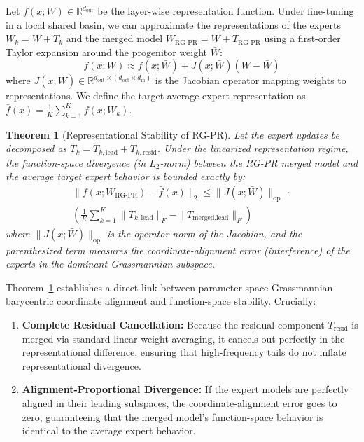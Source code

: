 \documentclass{article}
\theoremstyle{plain}
\newtheorem{theorem}{Theorem}[section]
\theoremstyle{definition}
\theoremstyle{remark}
\begin{document}
Let $f(x; W) \in \mathbb{R}^{d_{\text{out}}}$ be the layer-wise representation function. Under fine-tuning in a local shared basin, we can approximate the representations of the experts $W_k = \bar{W} + T_k$ and the merged model $W_{\text{RG-PR}} = \bar{W} + T_{\text{RG-PR}}$ using a first-order Taylor expansion around the progenitor weight $\bar{W}$:
\begin{equation}
    f(x; W) \approx f(x; \bar{W}) + J(x; \bar{W}) (W - \bar{W})
\end{equation}
where $J(x; \bar{W}) \in \mathbb{R}^{d_{\text{out}} \times (d_{\text{out}} \times d_{\text{in}})}$ is the Jacobian operator mapping weights to representations. We define the target average expert representation as $\bar{f}(x) = \frac{1}{K} \sum_{k=1}^K f(x; W_k)$.

\begin{theorem}[Representational Stability of RG-PR]
\label{thm:stability}
Let the expert updates be decomposed as $T_k = T_{k, \text{lead}} + T_{k, \text{resid}}$. Under the linearized representation regime, the function-space divergence (in $L_2$-norm) between the RG-PR merged model and the average target expert behavior is bounded exactly by:
\begin{equation}
\begin{aligned}
    \| f(x; W_{\text{RG-PR}}) - \bar{f}(x) \|_2 \le \| J(x; \bar{W}) \|_{\text{op}} \ \cdot \\
    \left( \frac{1}{K} \sum_{k=1}^K \| T_{k, \text{lead}} \|_F - \| T_{\text{merged}, \text{lead}} \|_F \right)
\end{aligned}
\end{equation}
where $\| J(x; \bar{W}) \|_{\text{op}}$ is the operator norm of the Jacobian, and the parenthesized term measures the coordinate-alignment error (interference) of the experts in the dominant Grassmannian subspace.
\end{theorem}

Theorem~\ref{thm:stability} establishes a direct link between parameter-space Grassmannian barycentric coordinate alignment and function-space stability. Crucially:
\begin{enumerate}
    \item \textbf{Complete Residual Cancellation:} Because the residual component $T_{\text{resid}}$ is merged via standard linear weight averaging, it cancels out perfectly in the representational difference, ensuring that high-frequency tails do not inflate representational divergence.
    \item \textbf{Alignment-Proportional Divergence:} If the expert models are perfectly aligned in their leading subspaces, the coordinate-alignment error goes to zero, guaranteeing that the merged model's function-space behavior is identical to the average expert behavior.
\end{enumerate}
\end{document}
